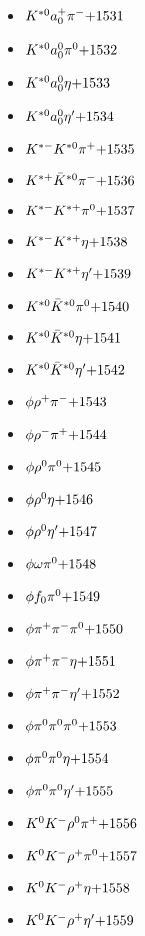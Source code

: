 \begin{multicols}{3}
\begin{itemize}
 \item $ K^{*0} a_{0}^{+} \pi^{-} \hfill{+1531}$
 \item $ K^{*0} a_{0}^{0} \pi^{0} \hfill{+1532}$
 \item $ K^{*0} a_{0}^{0} \eta \hfill{+1533}$
 \item $ K^{*0} a_{0}^{0} {\eta^{\prime}} \hfill{+1534}$
 \item $ K^{*-} K^{*0} \pi^{+} \hfill{+1535}$
 \item $ K^{*+} \bar{K}^{*0} \pi^{-} \hfill{+1536}$
 \item $ K^{*-} K^{*+} \pi^{0} \hfill{+1537}$
 \item $ K^{*-} K^{*+} \eta \hfill{+1538}$
 \item $ K^{*-} K^{*+} {\eta^{\prime}} \hfill{+1539}$
 \item $ K^{*0} \bar{K}^{*0} \pi^{0} \hfill{+1540}$
 \item $ K^{*0} \bar{K}^{*0} \eta \hfill{+1541}$
 \item $ K^{*0} \bar{K}^{*0} {\eta^{\prime}} \hfill{+1542}$
 \item $ \phi \rho^{+} \pi^{-} \hfill{+1543}$
 \item $ \phi \rho^{-} \pi^{+} \hfill{+1544}$
 \item $ \phi \rho^{0} \pi^{0} \hfill{+1545}$
 \item $ \phi \rho^{0} \eta \hfill{+1546}$
 \item $ \phi \rho^{0} {\eta^{\prime}} \hfill{+1547}$
 \item $ \phi \omega \pi^{0} \hfill{+1548}$
 \item $ \phi f_{0} \pi^{0} \hfill{+1549}$
 \item $ \phi \pi^{+} \pi^{-} \pi^{0} \hfill{+1550}$
 \item $ \phi \pi^{+} \pi^{-} \eta \hfill{+1551}$
 \item $ \phi \pi^{+} \pi^{-} {\eta^{\prime}} \hfill{+1552}$
 \item $ \phi \pi^{0} \pi^{0} \pi^{0} \hfill{+1553}$
 \item $ \phi \pi^{0} \pi^{0} \eta \hfill{+1554}$
 \item $ \phi \pi^{0} \pi^{0} {\eta^{\prime}} \hfill{+1555}$
 \item $ K^{0} K^{-} \rho^{0} \pi^{+} \hfill{+1556}$
 \item $ K^{0} K^{-} \rho^{+} \pi^{0} \hfill{+1557}$
 \item $ K^{0} K^{-} \rho^{+} \eta \hfill{+1558}$
 \item $ K^{0} K^{-} \rho^{+} {\eta^{\prime}} \hfill{+1559}$

\end{itemize}
\end{multicols}
